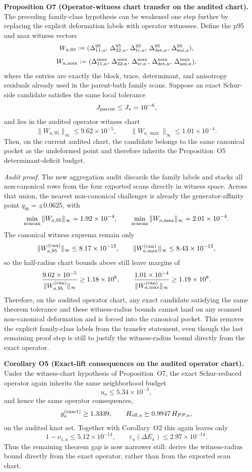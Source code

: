 \documentclass[aps,prd,onecolumn,notitlepage,nofootinbib,superscriptaddress,11pt,floatfix]{revtex4-2}
\begin{document}
\medskip\noindent\textbf{Proposition O7 (Operator-witness chart transfer on the audited chart).}
The preceding family-class hypothesis can be weakened one step further by replacing the explicit deformation labels with operator witnesses. Define the p95 and max witness vectors
\[
W_{a,95}:=
(\Delta^{95}_{11,a},\,\Delta^{95}_{22,a},\,\Delta^{95}_{{\rm tr},a},\,\Delta^{95}_{{\rm det},a},\,\Delta^{95}_{{\rm ani},a}),
\]
\[
W_{a,\max}:=
(\Delta^{\max}_{11,a},\,\Delta^{\max}_{22,a},\,\Delta^{\max}_{{\rm tr},a},\,\Delta^{\max}_{{\rm det},a},\,\Delta^{\max}_{{\rm ani},a}),
\]
where the entries are exactly the block, trace, determinant, and anisotropy residuals already used in the parent-bath family scans. Suppose an exact Schur-side candidate satisfies the same local tolerance
\[
J_{\rm parent}\le J_\ast=10^{-6},
\]
and lies in the audited operator witness chart
\[
\|W_{a,95}\|_\infty \le 9.62\times10^{-5},
\qquad
\|W_{a,\max}\|_\infty \le 1.01\times10^{-4}.
\]
Then, on the current audited chart, the candidate belongs to the same canonical pocket as the undeformed point and therefore inherits the Proposition~O5 determinant-deficit budget.

\textit{Audit proof.} The new aggregation audit  discards the family labels and stacks all non-canonical rows from the four exported scans directly in witness space. Across that union, the nearest non-canonical challenger is already the generator-affinity point \(q_{bb}=\pm 0.0625\), with
\[
\min_{\rm noncan}\|W_{a,95}\|_\infty = 1.92\times10^{-4},
\qquad
\min_{\rm noncan}\|W_{a,\max}\|_\infty = 2.01\times10^{-4}.
\]
The canonical witness suprema remain only
\[
\|W_{a,95}^{\rm(can)}\|_\infty \le 8.17\times10^{-13},
\qquad
\|W_{a,\max}^{\rm(can)}\|_\infty \le 8.43\times10^{-13},
\]
so the half-radius chart bounds above still leave margins of
\[
\frac{9.62\times10^{-5}}{\|W_{a,95}^{\rm(can)}\|_\infty}\ge 1.18\times10^{8},
\qquad
\frac{1.01\times10^{-4}}{\|W_{a,\max}^{\rm(can)}\|_\infty}\ge 1.19\times10^{8}.
\]
Therefore, on the audited operator chart, any exact candidate satisfying the same theorem tolerance and these witness-radius bounds cannot land on any scanned non-canonical deformation and is forced into the canonical pocket. This removes the explicit family-class labels from the transfer statement, even though the last remaining proof step is still to justify the witness-radius bound directly from the exact operator.

\medskip\noindent\textbf{Corollary O5 (Exact-lift consequences on the audited operator chart).}
Under the witness-chart hypothesis of Proposition~O7, the exact Schur-reduced operator again inherits the same neighborhood budget
\[
u_a\le 5.34\times10^{-3},
\]
and hence the same operator consequences,
\[
g_a^{\rm(exact)}\ge 1.3339,
\qquad
H_{{\rm eff},a}\succeq 0.9947\,H_{PP,a},
\]
on the audited knot set. Together with Corollary~O2 this again leaves only
\[
1-\nu_{1,a}\le 5.12\times10^{-14},
\qquad
\varepsilon_a(\Delta E_a)\le 2.97\times10^{-14}.
\]
Thus the remaining theorem gap is now narrower still: derive the witness-radius bound directly from the exact operator, rather than from the exported scan chart.
\end{document}
